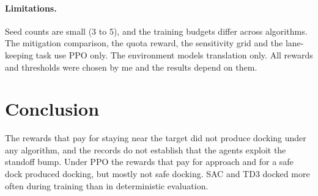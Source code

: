 \documentclass[11pt]{article}
\begin{document}
\paragraph{Limitations.} Seed counts are small (3 to 5), and the training
budgets differ across algorithms. The mitigation comparison, the quota reward,
the sensitivity grid and the lane-keeping task use PPO only. The environment
models translation only. All rewards and thresholds were chosen by me and the
results depend on them.

\section{Conclusion}

The rewards that pay for staying near the target did not produce docking under
any algorithm, and the records do not establish that the agents exploit the
standoff bump. Under PPO the rewards that pay for approach and for a safe dock
produced docking, but mostly not safe docking. SAC and TD3 docked more often
during training than in deterministic evaluation.
\end{document}
